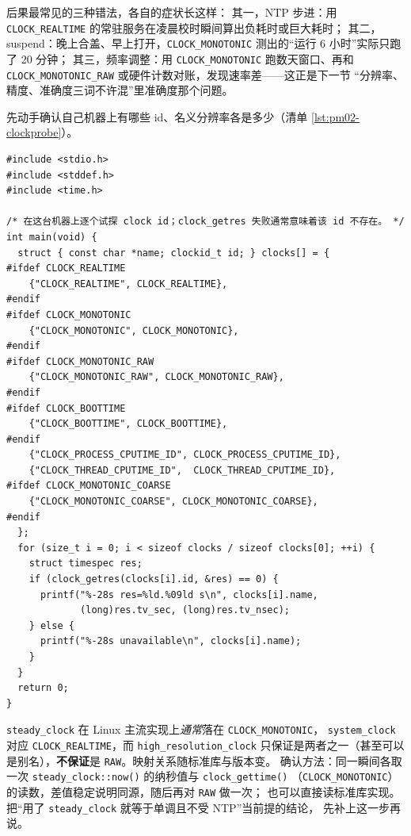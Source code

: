 \documentclass[12pt,a4paper,fontset=fandol]{ctexbook}
\newcommand{\Fn}[1]{\texttt{#1()}}
\newcommand{\Tp}[1]{\texttt{#1}}
\newcommand{\Bk}{\discretionary{}{}{}}
\newcommand{\Lang}[1]{\textsf{#1}}
\newcommand{\CPP}{\Lang{C++}}
\begin{document}
后果最常见的三种错法，各自的症状长这样：
其一，NTP 步进：用 \Tp{CLOCK{\Bk}\_REALTIME} 的常驻服务在凌晨校时瞬间算出负耗时或巨大耗时；
其二，suspend：晚上合盖、早上打开，\Tp{CLOCK{\Bk}\_MONOTONIC} 测出的``运行 6 小时''实际只跑了 20 分钟；
其三，频率调整：用 \Tp{CLOCK{\Bk}\_MONOTONIC} 跑数天窗口、再和 \Tp{CLOCK{\Bk}\_MONOTONIC{\Bk}\_RAW}
或硬件计数对账，发现速率差——这正是下一节 ``分辨率、精度、准确度三词不许混''里准确度那个问题。

先动手确认自己机器上有哪些 id、名义分辨率各是多少（清单 \ref{lst:pm02-clockprobe}）。

\begin{lstlisting}[style=cstyle, title={clock id 探针：存在性与名义分辨率}, label={lst:pm02-clockprobe}]
#include <stdio.h>
#include <stddef.h>
#include <time.h>

/* 在这台机器上逐个试探 clock id；clock_getres 失败通常意味着该 id 不存在。 */
int main(void) {
  struct { const char *name; clockid_t id; } clocks[] = {
#ifdef CLOCK_REALTIME
    {"CLOCK_REALTIME", CLOCK_REALTIME},
#endif
#ifdef CLOCK_MONOTONIC
    {"CLOCK_MONOTONIC", CLOCK_MONOTONIC},
#endif
#ifdef CLOCK_MONOTONIC_RAW
    {"CLOCK_MONOTONIC_RAW", CLOCK_MONOTONIC_RAW},
#endif
#ifdef CLOCK_BOOTTIME
    {"CLOCK_BOOTTIME", CLOCK_BOOTTIME},
#endif
    {"CLOCK_PROCESS_CPUTIME_ID", CLOCK_PROCESS_CPUTIME_ID},
    {"CLOCK_THREAD_CPUTIME_ID",  CLOCK_THREAD_CPUTIME_ID},
#ifdef CLOCK_MONOTONIC_COARSE
    {"CLOCK_MONOTONIC_COARSE", CLOCK_MONOTONIC_COARSE},
#endif
  };
  for (size_t i = 0; i < sizeof clocks / sizeof clocks[0]; ++i) {
    struct timespec res;
    if (clock_getres(clocks[i].id, &res) == 0) {
      printf("%-28s res=%ld.%09ld s\n", clocks[i].name,
             (long)res.tv_sec, (long)res.tv_nsec);
    } else {
      printf("%-28s unavailable\n", clocks[i].name);
    }
  }
  return 0;
}
\end{lstlisting}

\begin{note}[title={\CPP{} 的 \Tp{std::chrono} 映射到哪个 id：实现定义，必须自己确认}]
\Tp{steady{\Bk}\_clock} 在 Linux 主流实现上\emph{通常}落在 \Tp{CLOCK{\Bk}\_MONOTONIC}，
\Tp{system{\Bk}\_clock} 对应 \Tp{CLOCK{\Bk}\_REALTIME}，而 \Tp{high{\Bk}\_resolution{\Bk}\_clock}
只保证是两者之一（甚至可以是别名），\textbf{不保证}是 \Tp{RAW}。映射关系随标准库与版本变。
确认方法：同一瞬间各取一次 \Tp{steady{\Bk}\_clock::now()} 的纳秒值与 \Fn{clock{\Bk}\_gettime}
（\Tp{CLOCK{\Bk}\_MONOTONIC}）的读数，差值稳定说明同源，随后再对 \Tp{RAW} 做一次；
也可以直接读标准库实现。把``用了 \Tp{steady{\Bk}\_clock} 就等于单调且不受 NTP''当前提的结论，
先补上这一步再说。
\end{note}
\end{document}
